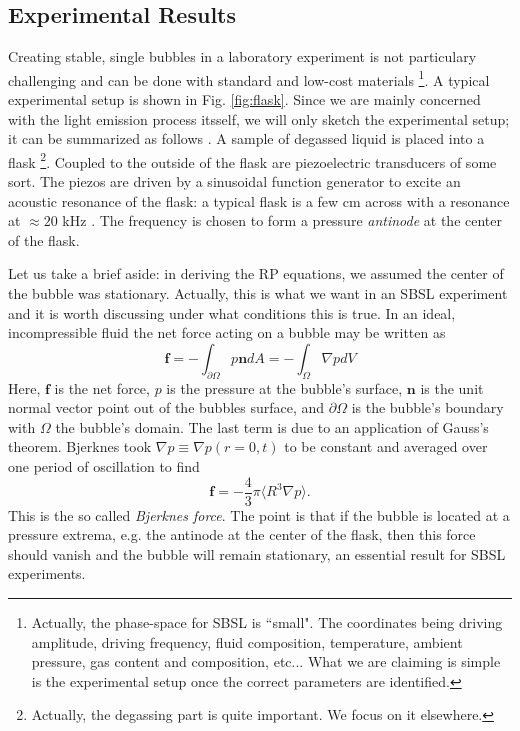 \documentclass[rmp,aps,nofootinbib,superscriptaddress,floatfix]{revtex4-2}
\begin{document}
\subsection{Experimental Results}
Creating stable, single bubbles in a laboratory experiment is not particulary challenging and can be done with standard and low-cost materials \footnote{Actually, the phase-space for SBSL is ``small". The coordinates being driving amplitude, driving frequency, fluid composition, temperature, ambient pressure, gas content and composition, etc... What we are claiming is simple is the experimental setup once the correct parameters are identified.}. A typical experimental setup is shown in Fig. \ref{fig:flask}. Since we are mainly concerned with the light emission process itsself, we will only sketch the experimental setup; it can be summarized as follows \cite{lentz1995mie,gaitan1990experimental,gaitan1992sonoluminescence,gompf2000mie,brenner2002single,yasui2018acoustic,brennen2014cavitation,suslick2008inside}. A sample of degassed liquid is placed into a flask \footnote{Actually, the degassing part is quite important. We focus on it elsewhere.}. Coupled to the outside of the flask are piezoelectric transducers of some sort. The piezos are driven by a sinusoidal function generator to excite an acoustic resonance of the flask: a typical flask is a few cm across with a resonance at $\approx 20$ kHz \cite{brenner2002single}. The frequency is chosen to form a pressure \emph{antinode} at the center of the flask.

Let us take a brief aside: in deriving the RP equations, we assumed the center of the bubble was stationary. Actually, this is what we want in an SBSL experiment and it is worth discussing under what conditions this is true. In an ideal, incompressible fluid the net force acting on a bubble may be written as 
\begin{equation}
    \bm{f}=-\int_{\partial \Omega} p \bm{n} dA = -\int_\Omega \nabla p dV
\end{equation}
Here, $\bm{f}$ is the net force, $p$ is the pressure at the bubble's surface, $\bm{n}$ is the unit normal vector point out of the bubbles surface, and $\partial \Omega$ is the bubble's boundary with $\Omega$ the bubble's domain. The last term is due to an application of Gauss's theorem. Bjerknes \cite{bjerknes1909kraftfelder} took $\nabla p \equiv \nabla p(r=0,t)$ to be constant and averaged over one period of oscillation to find 
\begin{equation}
    \bm{f} = -\frac{4}{3}\pi \langle R^3 \nabla p \rangle.
    \label{eq:Bj_force}
\end{equation}
This is the so called \emph{Bjerknes force}. The point is that if the bubble is located at a pressure extrema, e.g. the antinode at the center of the flask, then this force should vanish and the bubble will remain stationary, an essential result for SBSL experiments.
\end{document}
